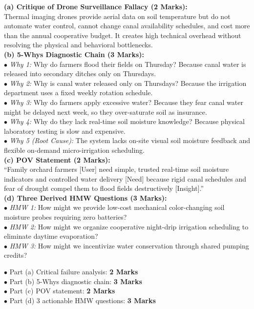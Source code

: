 \begin{solutionbox}
\textbf{(a) Critique of Drone Surveillance Fallacy (2 Marks):}\\
Thermal imaging drones provide aerial data on soil temperature but do not automate water control, cannot change canal availability schedules, and cost more than the annual cooperative budget. It creates high technical overhead without resolving the physical and behavioral bottlenecks.\\
\textbf{(b) 5-Whys Diagnostic Chain (3 Marks):}\\
$\bullet$ \textit{Why 1:} Why do farmers flood their fields on Thursday? Because canal water is released into secondary ditches only on Thursdays.\\
$\bullet$ \textit{Why 2:} Why is canal water released only on Thursdays? Because the irrigation department uses a fixed weekly rotation schedule.\\
$\bullet$ \textit{Why 3:} Why do farmers apply excessive water? Because they fear canal water might be delayed next week, so they over-saturate soil as insurance.\\
$\bullet$ \textit{Why 4:} Why do they lack real-time soil moisture knowledge? Because physical laboratory testing is slow and expensive.\\
$\bullet$ \textit{Why 5 (Root Cause):} The system lacks on-site visual soil moisture feedback and flexible on-demand micro-irrigation scheduling.\\
\textbf{(c) POV Statement (2 Marks):}\\
``Family orchard farmers [User] need simple, trusted real-time soil moisture indicators and controlled water delivery [Need] because rigid canal schedules and fear of drought compel them to flood fields destructively [Insight].''\\
\textbf{(d) Three Derived HMW Questions (3 Marks):}\\
$\bullet$ \textit{HMW 1:} How might we provide low-cost mechanical color-changing soil moisture probes requiring zero batteries?\\
$\bullet$ \textit{HMW 2:} How might we organize cooperative night-drip irrigation scheduling to eliminate daytime evaporation?\\
$\bullet$ \textit{HMW 3:} How might we incentivize water conservation through shared pumping credits?
\begin{markingrubric}
$\bullet$ Part (a) Critical failure analysis: \textbf{2 Marks}\\
$\bullet$ Part (b) 5-Whys diagnostic chain: \textbf{3 Marks}\\
$\bullet$ Part (c) POV statement: \textbf{2 Marks}\\
$\bullet$ Part (d) 3 actionable HMW questions: \textbf{3 Marks}
\end{markingrubric}
\end{solutionbox}
